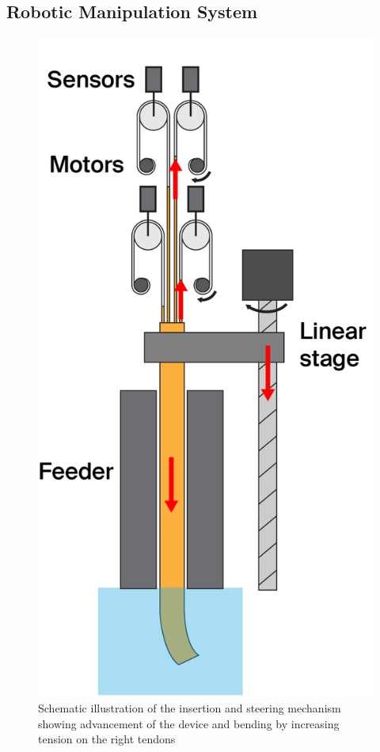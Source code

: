\subsection{Robotic Manipulation System}
\begin{figure} 
    \centering
    \includegraphics[width=\linewidth]{images/Hardware/insertion.PNG}
    \caption{Schematic illustration of the insertion and steering mechanism showing advancement of the device and bending by increasing tension on the right tendons}
    \label{fig:insertionschematic}
\end{figure}
